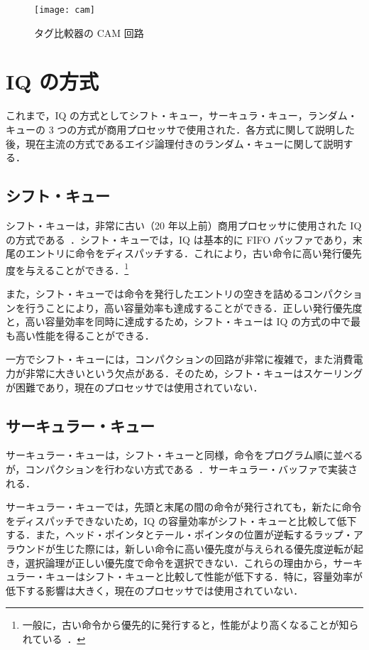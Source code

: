 \begin{figure}[htb]
  \texttt{[image: cam]}
  \caption{タグ比較器の CAM 回路}
  \label{fig:cam}
\end{figure}

\section{IQ の方式}
\label{sec:iq_scheme}
これまで，IQ の方式としてシフト・キュー，サーキュラ・キュー，ランダム・キューの 3 つの方式が商用プロセッサで使用された．各方式に関して説明した後，現在主流の方式であるエイジ論理付きのランダム・キューに関して説明する．

\subsection{シフト・キュー}
シフト・キューは，非常に古い（20 年以上前）商用プロセッサに使用された IQ の方式である~\cite{Farrell1998}．シフト・キューでは，IQ は基本的に FIFO バッファであり，末尾のエントリに命令をディスパッチする．これにより，古い命令に高い発行優先度を与えることができる．\footnote{一般に，古い命令から優先的に発行すると，性能がより高くなることが知られている~\cite{Butler1992}．}

また，シフト・キューでは命令を発行したエントリの空きを詰めるコンパクションを行うことにより，高い容量効率も達成することができる．正しい発行優先度と，高い容量効率を同時に達成するため，シフト・キューは IQ の方式の中で最も高い性能を得ることができる．

一方でシフト・キューには，コンパクションの回路が非常に複雑で，また消費電力が非常に大きいという欠点がある．そのため，シフト・キューはスケーリングが困難であり，現在のプロセッサでは使用されていない．

\subsection{サーキュラー・キュー}
サーキュラー・キューは，シフト・キューと同様，命令をプログラム順に並べるが，コンパクションを行わない方式である~\cite{Abella:survey2003}．サーキュラー・バッファで実装される．

サーキュラー・キューでは，先頭と末尾の間の命令が発行されても，新たに命令をディスパッチできないため，IQ の容量効率がシフト・キューと比較して低下する．また，ヘッド・ポインタとテール・ポインタの位置が逆転するラップ・アラウンドが生じた際には，新しい命令に高い優先度が与えられる優先度逆転が起き，選択論理が正しい優先度で命令を選択できない．これらの理由から，サーキュラー・キューはシフト・キューと比較して性能が低下する．特に，容量効率が低下する影響は大きく，現在のプロセッサでは使用されていない．

